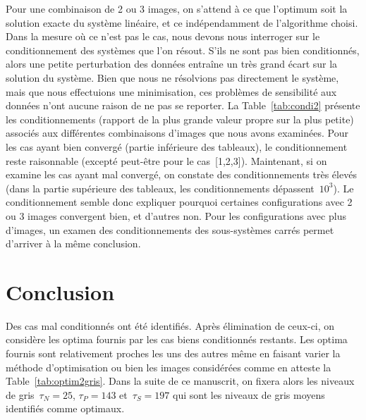 \documentclass[main.tex]{subfiles}
\begin{document}
Pour une combinaison de 2 ou 3 images, on s'attend à ce que l'optimum soit la solution exacte du système linéaire, et ce indépendamment de l'algorithme choisi. Dans la mesure où ce n'est pas le cas, nous devons nous interroger sur le conditionnement des systèmes que l'on résout. S'ils ne 
sont pas bien conditionnés, alors une petite perturbation des données entraîne un très grand écart sur la solution du système. Bien que nous ne résolvions pas directement le système, mais que nous effectuions une minimisation, ces problèmes de sensibilité aux données n'ont aucune raison de ne pas se reporter. La Table~\ref{tab:condi2} présente les conditionnements (rapport de la plus grande valeur propre sur la plus petite) associés aux différentes combinaisons d'images que nous avons examinées. 
Pour les cas ayant bien convergé (partie inférieure des tableaux), le conditionnement reste raisonnable (excepté peut-être pour le cas~[1,2,3]). 
Maintenant, si on examine les cas ayant mal convergé, on constate des conditionnements très élevés (dans la partie supérieure des tableaux, les conditionnements dépassent~$10^3$). 
Le conditionnement semble donc expliquer pourquoi certaines configurations avec 2 ou 3 images convergent bien, et d'autres non. 
Pour les configurations avec plus d'images, un examen des conditionnements des sous-systèmes carrés permet d'arriver à la même conclusion. 


\section{Conclusion}
Des cas mal conditionnés ont été identifiés. Après élimination de ceux-ci, on considère les optima fournis par les cas biens conditionnés restants. Les optima fournis sont relativement proches les uns des autres même en faisant varier la méthode d'optimisation ou bien les images considérées comme en atteste la Table~\ref{tab:optim2gris}. Dans la suite de ce manuscrit, on fixera alors les niveaux de gris~$\tau_N=25$, $\tau_P=143$ et~$\tau_S=197$ qui sont les niveaux de gris moyens identifiés comme optimaux. 
\end{document}
